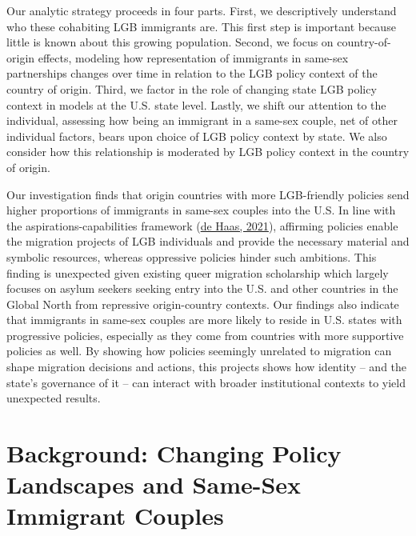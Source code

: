\documentclass[
  12pt,
]{article}
\begin{document}
Our analytic strategy proceeds in four parts. First, we descriptively understand who these cohabiting LGB immigrants are. This first step is important because little is known about this growing population. Second, we focus on country-of-origin effects, modeling how representation of immigrants in same-sex partnerships changes over time in relation to the LGB policy context of the country of origin. Third, we factor in the role of changing state LGB policy context in models at the U.S. state level. Lastly, we shift our attention to the individual, assessing how being an immigrant in a same-sex couple, net of other individual factors, bears upon choice of LGB policy context by state. We also consider how this relationship is moderated by LGB policy context in the country of origin.

Our investigation finds that origin countries with more LGB-friendly policies send higher proportions of immigrants in same-sex couples into the U.S. In line with the aspirations-capabilities framework (\protect\hyperlink{ref-dehaas_2021}{de Haas, 2021}), affirming policies enable the migration projects of LGB individuals and provide the necessary material and symbolic resources, whereas oppressive policies hinder such ambitions. This finding is unexpected given existing queer migration scholarship which largely focuses on asylum seekers seeking entry into the U.S. and other countries in the Global North from repressive origin-country contexts. Our findings also indicate that immigrants in same-sex couples are more likely to reside in U.S. states with progressive policies, especially as they come from countries with more supportive policies as well. By showing how policies seemingly unrelated to migration can shape migration decisions and actions, this projects shows how identity -- and the state's governance of it -- can interact with broader institutional contexts to yield unexpected results.

\hypertarget{background-changing-policy-landscapes-and-same-sex-immigrant-couples}{%
\section{Background: Changing Policy Landscapes and Same-Sex Immigrant Couples}\label{background-changing-policy-landscapes-and-same-sex-immigrant-couples}}
\end{document}
